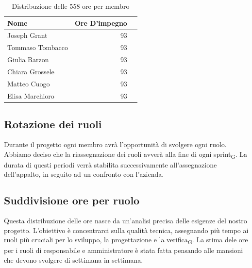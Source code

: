 \documentclass[11pt,a4paper]{article}
\newcommand{\gls}[1]{#1\textsubscript{G}}
\begin{document}
\begin{table}[H]
    \centering
    \begin{tabular}{|l|r|r|}
        \hline
         \textbf{Nome}& \textbf{Ore D'impegno}  \\
         \hline
         Joseph Grant&93 \\
         \hline
         Tommaso Tombacco&93 \\
         \hline
         Giulia Barzon&93 \\
         \hline
         Chiara Grossele&93 \\
         \hline
         Matteo Cuogo&93 \\ 
         \hline
         Elisa Marchioro&93 \\
         \hline
    \end{tabular}
    \caption{Distribuzione delle 558 ore per membro}
    \label{tab:ore_membro}
\end{table}

\vspace{1cm}

\subsection{Rotazione dei ruoli}
Durante il progetto ogni membro avrà l'opportunità di svolgere ogni ruolo. Abbiamo deciso che la riassegnazione dei ruoli avverà alla fine di ogni \gls{sprint}. La durata di questi periodi verrà stabilita successivamente all'assegnazione dell'appalto, in seguito ad un confronto con l'azienda.

\vspace{1cm}

\subsection{Suddivisione ore per ruolo}
Questa distribuzione delle ore nasce da un'analisi precisa delle esigenze del nostro progetto. L'obiettivo è concentrarci sulla qualità tecnica, assegnando più tempo ai ruoli più cruciali per lo sviluppo, la progettazione e la \gls{verifica}. La stima dele ore per i ruoli di responsabile e amministratore è stata fatta pensando alle mansioni che devono svolgere di settimana in settimana.
\end{document}
